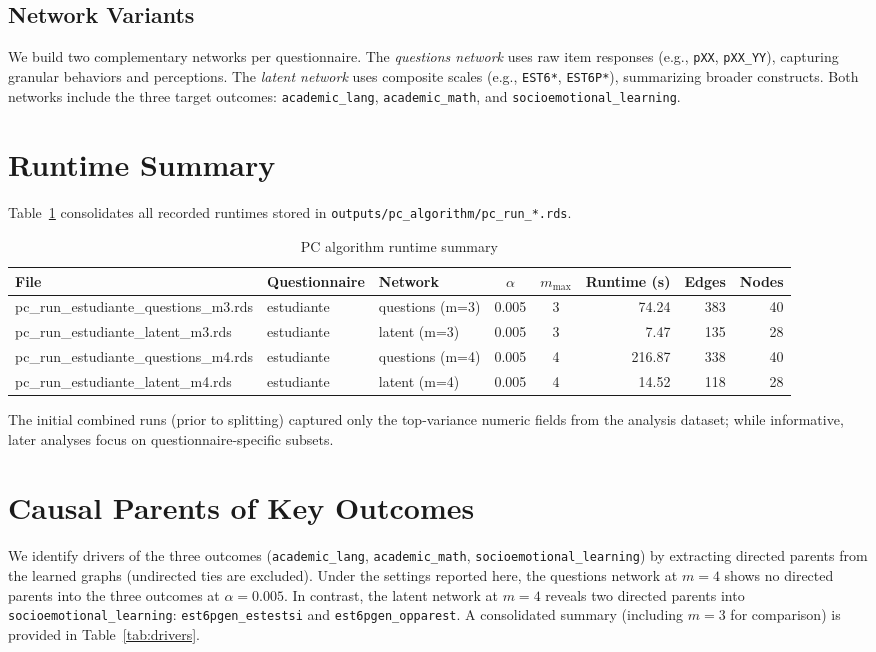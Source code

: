 \documentclass[11pt]{article}
\begin{document}
\subsection{Network Variants}
We build two complementary networks per questionnaire. The \emph{questions network} uses raw item responses (e.g., \texttt{pXX}, \texttt{pXX\_YY}), capturing granular behaviors and perceptions. The \emph{latent network} uses composite scales (e.g., \texttt{EST6*}, \texttt{EST6P*}), summarizing broader constructs. Both networks include the three target outcomes: \texttt{academic\_lang}, \texttt{academic\_math}, and \texttt{socioemotional\_learning}.

\section{Runtime Summary}
Table~\ref{tab:runtime} consolidates all recorded runtimes stored in \texttt{outputs/pc\_algorithm/pc\_run\_*.rds}.

\begin{table}[H]
  \centering
  \caption{PC algorithm runtime summary}
  \label{tab:runtime}
  \begin{tabularx}{\textwidth}{@{}>{\ttfamily\small}X l >{\raggedright\arraybackslash}X c c r r r@{}}
    \toprule
    File & Questionnaire & Network & $\alpha$ & $m_{\max}$ & Runtime (s) & Edges & Nodes \\
    \midrule
    pc\_run\_estudiante\_questions\_m3.rds & estudiante & questions (m=3) & 0.005 & 3 & 74.24 & 383 & 40 \\
    pc\_run\_estudiante\_latent\_m3.rds & estudiante & latent (m=3) & 0.005 & 3 & 7.47 & 135 & 28 \\
    pc\_run\_estudiante\_questions\_m4.rds & estudiante & questions (m=4) & 0.005 & 4 & 216.87 & 338 & 40 \\
    pc\_run\_estudiante\_latent\_m4.rds & estudiante & latent (m=4) & 0.005 & 4 & 14.52 & 118 & 28 \\
    \bottomrule
  \end{tabularx}
\end{table}

The initial combined runs (prior to splitting) captured only the top-variance numeric fields from the analysis dataset; while informative, later analyses focus on questionnaire-specific subsets.

\section{Causal Parents of Key Outcomes}
We identify drivers of the three outcomes (\texttt{academic\_lang}, \texttt{academic\_math}, \texttt{socioemotional\_learning}) by extracting directed parents from the learned graphs (undirected ties are excluded). Under the settings reported here, the questions network at $m=4$ shows no directed parents into the three outcomes at $\alpha=0.005$. In contrast, the latent network at $m=4$ reveals two directed parents into \texttt{socioemotional\_learning}: \texttt{est6pgen\_estestsi} and \texttt{est6pgen\_opparest}. A consolidated summary (including $m=3$ for comparison) is provided in Table~\ref{tab:drivers}.
\end{document}
